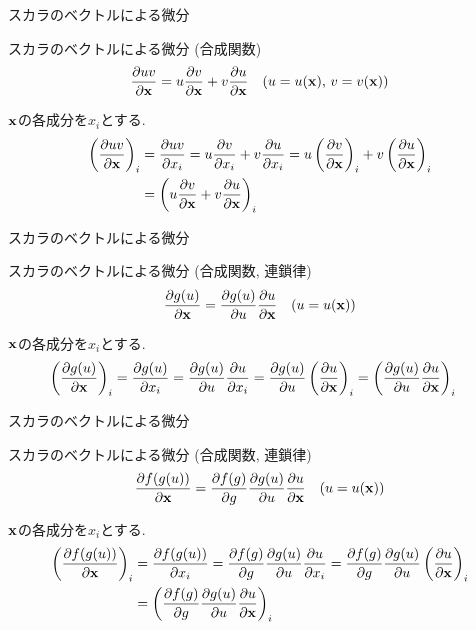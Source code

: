 \documentclass[dvipdfmx,notheorems,t]{beamer}
\begin{document}
\begin{frame}{スカラのベクトルによる微分}
\begin{block}{スカラのベクトルによる微分 (合成関数)}
  \begin{align*}
    \pdv{uv}{\vb{x}} &= u \pdv{v}{\vb{x}} + v \pdv{u}{\vb{x}}
      & \text{($u = u(\vb{x})$, $v = v(\vb{x})$)}
  \end{align*}
\end{block}

$\vb{x}$の各成分を$x_i$とする.
\begin{align*}
  \left( \pdv{uv}{\vb{x}} \right)_i &= \pdv{uv}{x_i}
    = u \pdv{v}{x_i} + v \pdv{u}{x_i}
    = u \left( \pdv{v}{\vb{x}} \right)_i + v \left( \pdv{u}{\vb{x}} \right)_i \\
    &= \left( u \pdv{v}{\vb{x}} + v \pdv{u}{\vb{x}} \right)_i
\end{align*}
\end{frame}

\begin{frame}{スカラのベクトルによる微分}
\begin{block}{スカラのベクトルによる微分 (合成関数, 連鎖律)}
  \begin{align*}
    \pdv{g(u)}{\vb{x}} &= \pdv{g(u)}{u} \pdv{u}{\vb{x}}
      & \text{($u = u(\vb{x})$)}
  \end{align*}
\end{block}

$\vb{x}$の各成分を$x_i$とする.
\begin{align*}
  \left( \pdv{g(u)}{\vb{x}} \right)_i &= \pdv{g(u)}{x_i}
    = \pdv{g(u)}{u} \pdv{u}{x_i}
    = \pdv{g(u)}{u} \left( \pdv{u}{\vb{x}} \right)_i
    = \left( \pdv{g(u)}{u} \pdv{u}{\vb{x}} \right)_i
\end{align*}
\end{frame}

\begin{frame}{スカラのベクトルによる微分}
\begin{block}{スカラのベクトルによる微分 (合成関数, 連鎖律)}
  \begin{align*}
    \pdv{f(g(u))}{\vb{x}} &= \pdv{f(g)}{g} \pdv{g(u)}{u} \pdv{u}{\vb{x}}
      & \text{($u = u(\vb{x})$)}
  \end{align*}
\end{block}

$\vb{x}$の各成分を$x_i$とする.
\begin{align*}
  \left( \pdv{f(g(u))}{\vb{x}} \right)_i &= \pdv{f(g(u))}{x_i}
    = \pdv{f(g)}{g} \pdv{g(u)}{u} \pdv{u}{x_i}
    = \pdv{f(g)}{g} \pdv{g(u)}{u} \left( \pdv{u}{\vb{x}} \right)_i \\
    &= \left( \pdv{f(g)}{g} \pdv{g(u)}{u} \pdv{u}{\vb{x}} \right)_i
\end{align*}
\end{frame}
\end{document}
